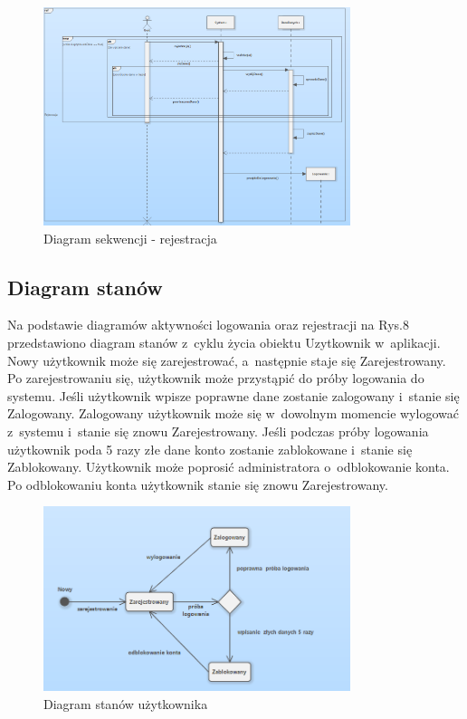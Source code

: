 \documentclass[12pt, letterpaper]{article}
\begin{document}
\begin{figure}[h]
  \centering
      \includegraphics[width=0.8\textwidth]{seqDiagramRejestracja}
  \caption{Diagram sekwencji - rejestracja}
\end{figure}
		
		\newpage		
		
		\subsection{Diagram stanów}
		
		Na podstawie diagramów aktywności logowania oraz rejestracji na Rys.8 przedstawiono diagram stanów z~cyklu życia obiektu Uzytkownik w~aplikacji.\\
		
		Nowy użytkownik może się zarejestrować, a~następnie staje się Zarejestrowany. Po zarejestrowaniu się, użytkownik może przystąpić do próby logowania do systemu. Jeśli użytkownik wpisze poprawne dane zostanie zalogowany i~stanie się Zalogowany. Zalogowany użytkownik może się w~dowolnym momencie wylogować z~systemu i~stanie się znowu Zarejestrowany. Jeśli podczas próby logowania użytkownik poda 5 razy złe dane konto zostanie zablokowane i~stanie się Zablokowany. Użytkownik może poprosić administratora o~odblokowanie konta. Po odblokowaniu konta użytkownik stanie się znowu Zarejestrowany.
		
\begin{figure}[h]
  \centering
      \includegraphics[width=0.8\textwidth]{activeDiagramUser}
  \caption{Diagram stanów użytkownika}
\end{figure}
		
\end{document}
